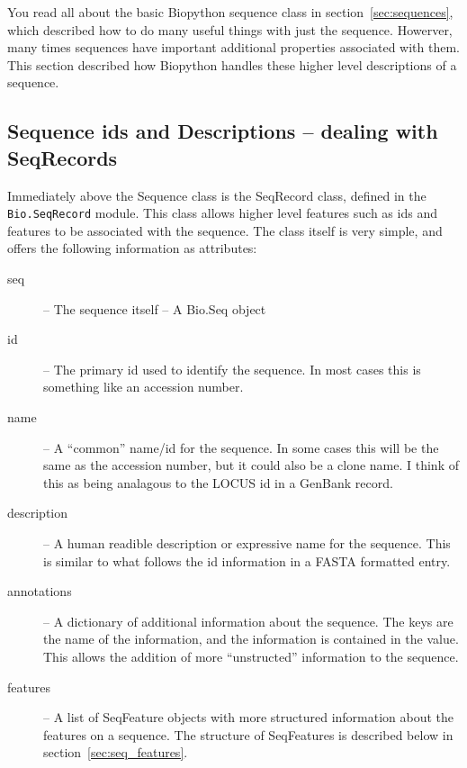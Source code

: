 \documentclass{report}
\begin{document}
You read all about the basic Biopython sequence class in section~\ref{sec:sequences}, which described how to do many useful things with just the sequence. Howerver, many times sequences have important additional properties associated with them. This section described how Biopython handles these higher level descriptions of a sequence.

\subsection{Sequence ids and Descriptions -- dealing with SeqRecords}

Immediately above the Sequence class is the SeqRecord class, defined in the \verb|Bio.SeqRecord| module. This class allows higher level features such as ids and features to be associated with the sequence. The class itself is very simple, and offers the following information as attributes:

\begin{description}
  \item[seq] -- The sequence itself -- A Bio.Seq object

  \item[id] -- The primary id used to identify the sequence. In most cases this is something like an accession number.

  \item[name] -- A ``common'' name/id for the sequence. In some cases this will be the same as the accession number, but it could also be a clone name. I think of this as being analagous to the LOCUS id in a GenBank record.

  \item[description] -- A human readible description or expressive name for the sequence. This is similar to what follows the id information in a FASTA formatted entry.

  \item[annotations] -- A dictionary of additional information about the sequence. The keys are the name of the information, and the information is contained in the value. This allows the addition of more ``unstructed'' information to the sequence.

  \item[features] -- A list of SeqFeature objects with more structured information about the features on a sequence. The structure of SeqFeatures is described below in section~\ref{sec:seq_features}.
\end{description}
\end{document}
